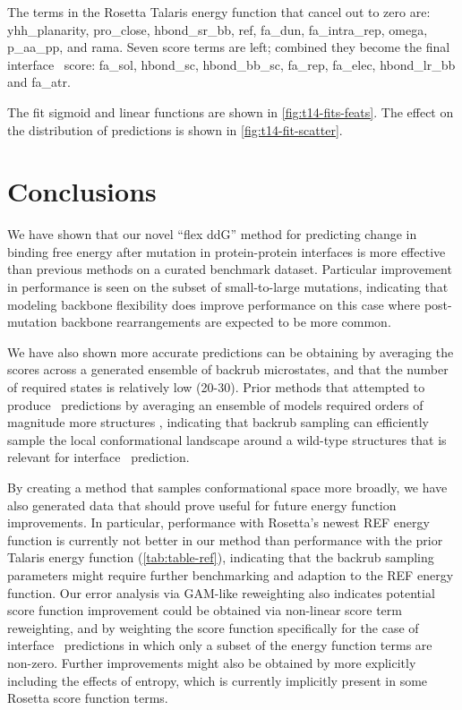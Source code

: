 The terms in the Rosetta Talaris energy function that cancel out to zero are: yhh\_planarity, pro\_close, hbond\_sr\_bb, ref, fa\_dun, fa\_intra\_rep, omega, p\_aa\_pp, and rama.
Seven score terms are left; combined they become the final interface \ddg\ score: fa\_sol, hbond\_sc, hbond\_bb\_sc, fa\_rep, fa\_elec, hbond\_lr\_bb and fa\_atr.

The fit sigmoid and linear functions are shown in \cref{fig:t14-fits-feats}.
The effect on the distribution of predictions is shown in \cref{fig:t14-fit-scatter}.

\section{Conclusions}

We have shown that our novel ``flex ddG'' method for predicting change in binding free energy after mutation in protein-protein interfaces is more effective than previous methods on a curated benchmark dataset.
Particular improvement in performance is seen on the subset of small-to-large mutations, indicating that modeling backbone flexibility does improve performance on this case where post-mutation backbone rearrangements are expected to be more common.

We have also shown more accurate predictions can be obtaining by averaging the scores across a generated ensemble of backrub microstates, and that the number of required states is relatively low (20-30).
Prior methods that attempted to produce \ddg\ predictions by averaging an ensemble of models required orders of magnitude more structures  \cite{benedix_predicting_2009}, indicating that backrub sampling can efficiently sample the local conformational landscape around a wild-type structures that is relevant for interface \ddg\ prediction.

By creating a method that samples conformational space more broadly, we have also generated data that should prove useful for future energy function improvements.
In particular, performance with Rosetta's newest REF energy function\cite{alford_rosetta_2017} is currently not better in our method than performance with the prior Talaris energy function (\cref{tab:table-ref}), indicating that the backrub sampling parameters might require further benchmarking and adaption to the REF energy function.
Our error analysis via GAM-like reweighting also indicates potential score function improvement could be obtained via non-linear score term reweighting, and by weighting the score function specifically for the case of interface \ddg\ predictions in which only a subset of the energy function terms are non-zero.
Further improvements might also be obtained by more explicitly including the effects of entropy, which is currently implicitly present in some Rosetta score function terms.

